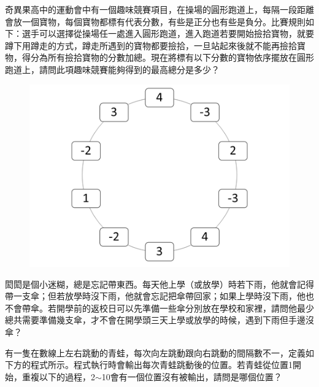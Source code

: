 \documentclass[a4paper, 12pt, addpoints]{exam}
\begin{document}
\vspace{0.1in}
\begin{questions}
    \question[4]
    奇異果高中的運動會中有一個趣味競賽項目，在操場的圓形跑道上，每隔一段距離會放一個寶物，每個寶物都標有代表分數，有些是正分也有些是負分。比賽規則如下：選手可以選擇從操場任一處進入圓形跑道，進入跑道若要開始撿拾寶物，就要蹲下用蹲走的方式，蹲走所遇到的寶物都要撿拾，一旦站起來後就不能再撿拾寶物，得分為所有撿拾寶物的分數加總。現在將標有以下分數的寶物依序擺放在圓形跑道上，請問此項趣味競賽能夠得到的最高總分是多少？

    \begin{figure}[H]
        \centerline{\includegraphics{fig/sports.png}}
    \end{figure}

    \question[4]
    閎閎是個小迷糊，總是忘記帶東西。每天他上學（或放學）時若下雨，他就會記得帶一支傘；但若放學時沒下雨，他就會忘記把傘帶回家；如果上學時沒下雨，他也不會帶傘。若開學前的返校日可以先準備一些傘分別放在學校和家裡，請問他最少總共需要準備幾支傘，才不會在開學頭三天上學或放學的時候，遇到下雨但手邊沒傘？


    \question[4]
    有一隻在數線上左右跳動的青蛙，每次向左跳動跟向右跳動的間隔數不一，定義如下方的程式所示。程式執行時會輸出每次青蛙跳動後的位置。若青蛙從位置1開始，重複以下的過程，2$\sim$10會有一個位置沒有被輸出，請問是哪個位置？


\end{questions}
\end{document}
